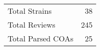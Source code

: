 \begin{tabular}{lr}
\toprule
Total Strains & 38 \\
Total Reviews & 245 \\
Total Parsed COAs & 25 \\
\bottomrule
\end{tabular}

